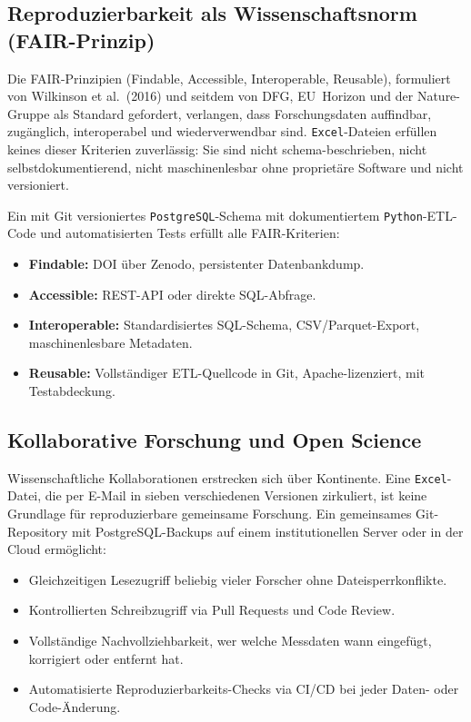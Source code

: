 \documentclass[12pt,a4paper]{report}
\theoremstyle{definition}
\theoremstyle{remark}
\newcommand{\excel}{\texttt{Excel}}
\newcommand{\pg}{\texttt{PostgreSQL}}
\newcommand{\py}{\texttt{Python}}
\begin{document}
\subsection{Reproduzierbarkeit als Wissenschaftsnorm (FAIR-Prinzip)}

Die FAIR-Prinzipien (Findable, Accessible, Interoperable, Reusable),
formuliert von Wilkinson et al.\ (2016) und seitdem von DFG,
EU~Horizon und der Nature-Gruppe als Standard gefordert, verlangen,
dass Forschungsdaten auffindbar, zugänglich, interoperabel und
wiederverwendbar sind.
\excel-Dateien erfüllen keines dieser Kriterien zuverlässig:
Sie sind nicht schema-beschrieben, nicht selbstdokumentierend,
nicht maschinenlesbar ohne proprietäre Software und nicht versioniert.

Ein mit Git versioniertes \pg-Schema mit dokumentiertem \py-ETL-Code
und automatisierten Tests erfüllt alle FAIR-Kriterien:
\begin{itemize}[leftmargin=1.5em, itemsep=2pt]
  \item \textbf{Findable:} DOI über Zenodo, persistenter Datenbankdump.
  \item \textbf{Accessible:} REST-API oder direkte SQL-Abfrage.
  \item \textbf{Interoperable:} Standardisiertes SQL-Schema,
        CSV/Parquet-Export, maschinenlesbare Metadaten.
  \item \textbf{Reusable:} Vollständiger ETL-Quellcode in Git,
        Apache-lizenziert, mit Testabdeckung.
\end{itemize}

\subsection{Kollaborative Forschung und Open Science}

Wissenschaftliche Kollaborationen erstrecken sich über Kontinente.
Eine \excel-Datei, die per E-Mail in sieben verschiedenen Versionen
zirkuliert, ist keine Grundlage für reproduzierbare gemeinsame
Forschung.
Ein gemeinsames Git-Repository mit PostgreSQL-Backups auf einem
institutionellen Server oder in der Cloud ermöglicht:
\begin{itemize}[leftmargin=1.5em, itemsep=2pt]
  \item Gleichzeitigen Lesezugriff beliebig vieler Forscher ohne
        Dateisperrkonflikte.
  \item Kontrollierten Schreibzugriff via Pull Requests und Code Review.
  \item Vollständige Nachvollziehbarkeit, wer welche Messdaten wann
        eingefügt, korrigiert oder entfernt hat.
  \item Automatisierte Reproduzierbarkeits-Checks via CI/CD bei jeder
        Daten- oder Code-Änderung.
\end{itemize}
\end{document}
